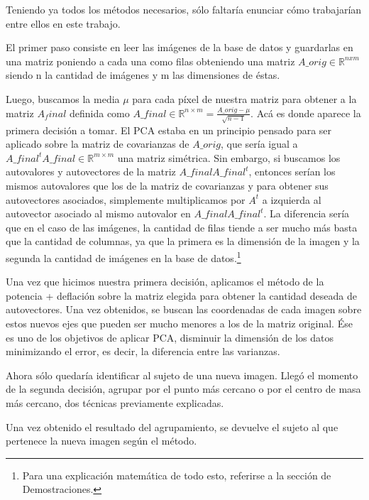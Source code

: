 Teniendo ya todos los métodos necesarios, sólo faltaría enunciar cómo trabajarían entre ellos en
este trabajo.

El primer paso consiste en leer las imágenes de la base de datos y guardarlas en una matriz poniendo
a cada una como filas obteniendo una matriz $A\_orig \in \mathbb{R}^{nxm}$ siendo n la cantidad de
imágenes y m las dimensiones de éstas.

Luego, buscamos la media $\mu$ para cada píxel de nuestra matriz para obtener a la matriz $A_final$
definida como $A\_final \in \mathbb{R}^{n \times m} = \frac{A\_orig - \mu}{\sqrt{n -1}}$. Acá es
donde aparece la primera decisión a tomar. El PCA estaba en un principio pensado para ser aplicado
sobre la matriz de covarianzas de $A\_orig$, que sería igual a $A\_final^t A\_final \in \mathbb{R}^{m
  \times m}$ una matriz simétrica. Sin embargo, si buscamos los autovalores y autovectores de la
matriz $A\_final A\_final^t$, entonces serían los mismos autovalores que los de la matriz de
covarianzas y para obtener sus autovectores asociados, simplemente multiplicamos por $A^t$ a
izquierda al autovector asociado al mismo autovalor en $A\_final A\_final^t$. La diferencia sería
que en el caso de las imágenes, la cantidad de filas tiende a ser mucho más basta que la cantidad de
columnas, ya que la primera es la dimensión de la imagen y la segunda la cantidad de imágenes en
la base de datos.\footnote{Para una explicación matemática de todo esto, referirse a la sección de
Demostraciones.}

Una vez que hicimos nuestra primera decisión, aplicamos el método de la potencia + deflación sobre
la matriz elegida para obtener la cantidad deseada de autovectores. Una vez obtenidos, se buscan las
coordenadas de cada imagen sobre estos nuevos ejes que pueden ser mucho menores a los de la matriz
original. Ése es uno de los objetivos de aplicar PCA, disminuir la dimensión de los datos
minimizando el error, es decir, la diferencia entre las varianzas.

Ahora sólo quedaría identificar al sujeto de una nueva imagen. Llegó el momento de la segunda
decisión, agrupar por el punto más cercano o por el centro de masa más cercano, dos técnicas
previamente explicadas.

Una vez obtenido el resultado del agrupamiento, se devuelve el sujeto al que pertenece la nueva
imagen según el método.
